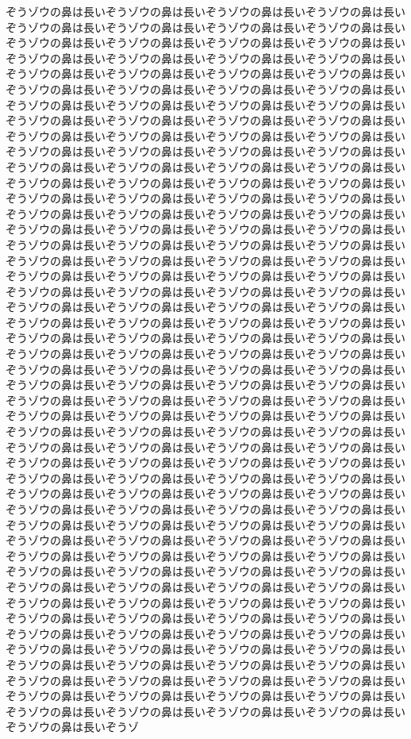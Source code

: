 ぞうゾウの鼻は長いぞうゾウの鼻は長いぞうゾウの鼻は長いぞうゾウの鼻は長いぞうゾウの鼻は長いぞうゾウの鼻は長いぞうゾウの鼻は長いぞうゾウの鼻は長いぞうゾウの鼻は長いぞうゾウの鼻は長いぞうゾウの鼻は長いぞうゾウの鼻は長いぞうゾウの鼻は長いぞうゾウの鼻は長いぞうゾウの鼻は長いぞうゾウの鼻は長いぞうゾウの鼻は長いぞうゾウの鼻は長いぞうゾウの鼻は長いぞうゾウの鼻は長いぞうゾウの鼻は長いぞうゾウの鼻は長いぞうゾウの鼻は長いぞうゾウの鼻は長いぞうゾウの鼻は長いぞうゾウの鼻は長いぞうゾウの鼻は長いぞうゾウの鼻は長いぞうゾウの鼻は長いぞうゾウの鼻は長いぞうゾウの鼻は長いぞうゾウの鼻は長いぞうゾウの鼻は長いぞうゾウの鼻は長いぞうゾウの鼻は長いぞうゾウの鼻は長いぞうゾウの鼻は長いぞうゾウの鼻は長いぞうゾウの鼻は長いぞうゾウの鼻は長いぞうゾウの鼻は長いぞうゾウの鼻は長いぞうゾウの鼻は長いぞうゾウの鼻は長いぞうゾウの鼻は長いぞうゾウの鼻は長いぞうゾウの鼻は長いぞうゾウの鼻は長いぞうゾウの鼻は長いぞうゾウの鼻は長いぞうゾウの鼻は長いぞうゾウの鼻は長いぞうゾウの鼻は長いぞうゾウの鼻は長いぞうゾウの鼻は長いぞうゾウの鼻は長いぞうゾウの鼻は長いぞうゾウの鼻は長いぞうゾウの鼻は長いぞうゾウの鼻は長いぞうゾウの鼻は長いぞうゾウの鼻は長いぞうゾウの鼻は長いぞうゾウの鼻は長いぞうゾウの鼻は長いぞうゾウの鼻は長いぞうゾウの鼻は長いぞうゾウの鼻は長いぞうゾウの鼻は長いぞうゾウの鼻は長いぞうゾウの鼻は長いぞうゾウの鼻は長いぞうゾウの鼻は長いぞうゾウの鼻は長いぞうゾウの鼻は長いぞうゾウの鼻は長いぞうゾウの鼻は長いぞうゾウの鼻は長いぞうゾウの鼻は長いぞうゾウの鼻は長いぞうゾウの鼻は長いぞうゾウの鼻は長いぞうゾウの鼻は長いぞうゾウの鼻は長いぞうゾウの鼻は長いぞうゾウの鼻は長いぞうゾウの鼻は長いぞうゾウの鼻は長いぞうゾウの鼻は長いぞうゾウの鼻は長いぞうゾウの鼻は長いぞうゾウの鼻は長いぞうゾウの鼻は長いぞうゾウの鼻は長いぞうゾウの鼻は長いぞうゾウの鼻は長いぞうゾウの鼻は長いぞうゾウの鼻は長いぞうゾウの鼻は長いぞうゾウの鼻は長いぞうゾウの鼻は長いぞうゾウの鼻は長いぞうゾウの鼻は長いぞうゾウの鼻は長いぞうゾウの鼻は長いぞうゾウの鼻は長いぞうゾウの鼻は長いぞうゾウの鼻は長いぞうゾウの鼻は長いぞうゾウの鼻は長いぞうゾウの鼻は長いぞうゾウの鼻は長いぞうゾウの鼻は長いぞうゾウの鼻は長いぞうゾウの鼻は長いぞうゾウの鼻は長いぞうゾウの鼻は長いぞうゾウの鼻は長いぞうゾウの鼻は長いぞうゾウの鼻は長いぞうゾウの鼻は長いぞうゾウの鼻は長いぞうゾウの鼻は長いぞうゾウの鼻は長いぞうゾウの鼻は長いぞうゾウの鼻は長いぞうゾウの鼻は長いぞうゾウの鼻は長いぞうゾウの鼻は長いぞうゾウの鼻は長いぞうゾウの鼻は長いぞうゾウの鼻は長いぞうゾウの鼻は長いぞうゾウの鼻は長いぞうゾウの鼻は長いぞうゾウの鼻は長いぞうゾウの鼻は長いぞうゾウの鼻は長いぞうゾウの鼻は長いぞうゾウの鼻は長いぞうゾウの鼻は長いぞうゾウの鼻は長いぞうゾウの鼻は長いぞうゾウの鼻は長いぞうゾウの鼻は長いぞうゾウの鼻は長いぞうゾウの鼻は長いぞうゾウの鼻は長いぞうゾウの鼻は長いぞうゾウの鼻は長いぞうゾウの鼻は長いぞうゾウの鼻は長いぞうゾウの鼻は長いぞうゾウの鼻は長いぞうゾウの鼻は長いぞうゾウの鼻は長いぞうゾウの鼻は長いぞうゾウの鼻は長いぞうゾウの鼻は長いぞうゾウの鼻は長いぞうゾウの鼻は長いぞうゾウの鼻は長いぞうゾウの鼻は長いぞうゾウの鼻は長いぞうゾウの鼻は長いぞうゾウの鼻は長いぞうゾウの鼻は長いぞうゾウの鼻は長いぞうゾウの鼻は長いぞうゾウの鼻は長いぞうゾウの鼻は長いぞうゾウの鼻は長いぞうゾウの鼻は長いぞうゾウの鼻は長いぞうゾウの鼻は長いぞうゾウの鼻は長いぞうゾウの鼻は長いぞうゾウの鼻は長いぞうゾウの鼻は長いぞうゾウの鼻は長いぞうゾウの鼻は長いぞうゾウの鼻は長いぞうゾウの鼻は長いぞうゾウの鼻は長いぞうゾウの鼻は長いぞうゾ